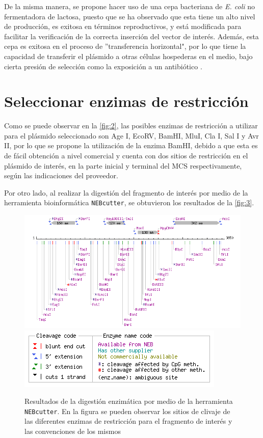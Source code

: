 \documentclass[12pt]{article}
\begin{document}
		De la misma manera, se propone hacer uso de una cepa bacteriana de \textit{E. coli} no fermentadora de lactosa, puesto que se ha observado que esta tiene un alto nivel de producción, es exitosa en t\'erminos reproductivos, y está modificada para facilitar la verificación de la correcta inserción del vector de interés. Además, esta cepa es exitosa en el proceso de ''transferencia horizontal", por lo que tiene la capacidad de transferir el plásmido a otras células hospederas en el medio, bajo cierta presión de selección como la exposición a un antibiótico \cite{marraffini2008crispr}.
		
	\section{Seleccionar enzimas de restricci\'on}
		Como se puede observar en la \autoref{fig:2}, las posibles enzimas de restricción a utilizar para el plásmido seleccionado son Age I, EcoRV, BamHI, MluI, Cla I, Sal I y Avr II, por lo que se propone la utilización de la enzima BamHI, debido a que esta es de fácil obtención a nivel comercial y cuenta con dos sitios de restricción en el plásmido de interés, en la parte inicial y terminal del MCS respectivamente, según las indicaciones del proveedor. 
		
		Por otro lado, al realizar la digesti\'on del fragmento de interés por medio de la herramienta bioinformática \texttt{NEBcutter}, se obtuvieron los resultados de la \autoref{fig:3}.
		\begin{figure}[h]
			\centering
			\includegraphics[width=\linewidth]{NEB0}
			\includegraphics[width=0.6\linewidth]{NEB1}
			\caption{Resultados de la digestión enzimática por medio de la herramienta \texttt{NEBcutter}. En la figura se pueden observar los sitios de clivaje de las diferentes enzimas de restricción para el fragmento de interés y las convenciones de los mismos}
			\label{fig:3}
		\end{figure}
	
\end{document}
